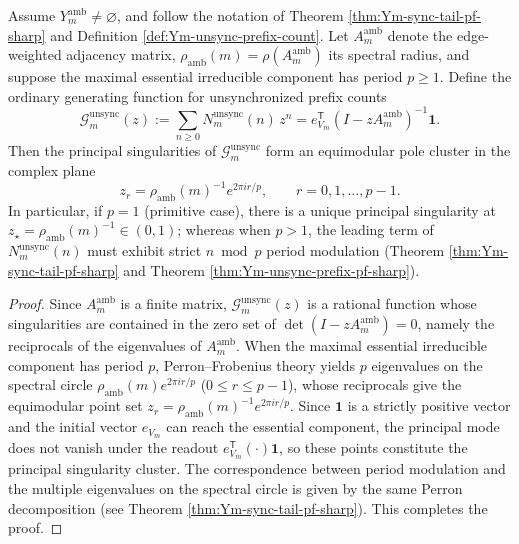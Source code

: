 \begin{corollary}\label{cor:Ym-unsync-star-pole-cluster}
Assume \(Y_m^{\mathrm{amb}}\neq\varnothing\), and follow the notation of Theorem \ref{thm:Ym-sync-tail-pf-sharp} and Definition \ref{def:Ym-unsync-prefix-count}.
Let \(A_m^{\mathrm{amb}}\) denote the edge-weighted adjacency matrix, \(\rho_{\mathrm{amb}}(m)=\rho(A_m^{\mathrm{amb}})\) its spectral radius, and suppose the maximal essential irreducible component has period \(p\ge 1\).
Define the ordinary generating function for unsynchronized prefix counts
\[
\mathcal{G}_m^{\mathrm{unsync}}(z)
:=\sum_{n\ge 0}N_m^{\mathrm{unsync}}(n)\,z^n
=e_{V_m}^{\mathsf T}(I-zA_m^{\mathrm{amb}})^{-1}\mathbf 1.
\]
Then the principal singularities of \(\mathcal{G}_m^{\mathrm{unsync}}\) form an equimodular pole cluster in the complex plane
\[
z_r=\rho_{\mathrm{amb}}(m)^{-1}e^{2\pi i r/p},\qquad r=0,1,\dots,p-1.
\]
In particular, if \(p=1\) (primitive case), there is a unique principal singularity at \(z_\star=\rho_{\mathrm{amb}}(m)^{-1}\in(0,1)\);
whereas when \(p>1\), the leading term of \(N_m^{\mathrm{unsync}}(n)\) must exhibit strict \(n\bmod p\) period modulation (Theorem \ref{thm:Ym-sync-tail-pf-sharp} and Theorem \ref{thm:Ym-unsync-prefix-pf-sharp}).
\end{corollary}
\begin{proof}
Since \(A_m^{\mathrm{amb}}\) is a finite matrix, \(\mathcal{G}_m^{\mathrm{unsync}}(z)\) is a rational function whose singularities are contained in the zero set of \(\det(I-zA_m^{\mathrm{amb}})=0\), namely the reciprocals of the eigenvalues of \(A_m^{\mathrm{amb}}\).
When the maximal essential irreducible component has period \(p\), Perron--Frobenius theory yields \(p\) eigenvalues on the spectral circle
\(
\rho_{\mathrm{amb}}(m)e^{2\pi i r/p}
\) (\(0\le r\le p-1\)), whose reciprocals give the equimodular point set
\(
z_r=\rho_{\mathrm{amb}}(m)^{-1}e^{2\pi i r/p}
\).
Since \(\mathbf 1\) is a strictly positive vector and the initial vector \(e_{V_m}\) can reach the essential component, the principal mode does not vanish under the readout \(e_{V_m}^{\mathsf T}(\cdot)\mathbf 1\), so these points constitute the principal singularity cluster.
The correspondence between period modulation and the multiple eigenvalues on the spectral circle is given by the same Perron decomposition (see Theorem \ref{thm:Ym-sync-tail-pf-sharp}). This completes the proof.
\end{proof}

